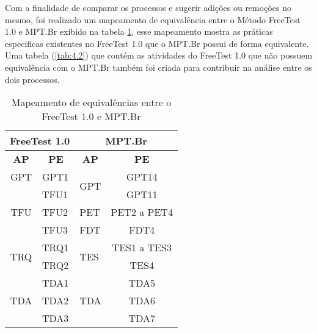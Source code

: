 Com a finalidade de comparar os processos e sugerir adições ou remoções no mesmo, foi realizado um mapeamento de equivalência entre o Método FreeTest 1.0 e MPT.Br exibido na tabela \ref{tab:4.1}, esse mapeamento mostra as práticas especificas existentes no FreeTest 1.0 que o MPT.Br possui de forma equivalente. Uma tabela (\ref{tab:4.2}) que contém as atividades do FreeTest 1.0 que não possuem equivalência com o MPT.Br também foi criada para contribuir na análise entre os dois processos.

\begin{table}[!ht]
\centering
\caption{Mapeamento de equivalências entre o FreeTest 1.0 e MPT.Br}
\label{tab:4.1}
\begin{tabular}{|c|l|l|c|}
\hline
\multicolumn{2}{|c|}{\textbf{FreeTest 1.0}}             & \multicolumn{2}{c|}{\textbf{MPT.Br}}           \\ \hline
\textbf{AP}          & \multicolumn{1}{c|}{\textbf{PE}} & \multicolumn{1}{c|}{\textbf{AP}} & \textbf{PE} \\ \hline
GPT                  & GPT1                             & \multirow{2}{*}{GPT}             & GPT14       \\ \cline{1-2} \cline{4-4} 
\multirow{3}{*}{TFU} & TFU1                             &                                  & GPT11       \\ \cline{2-4} 
                     & TFU2                             & PET                              & PET2 a PET4 \\ \cline{2-4} 
                     & TFU3                             & FDT                              & FDT4        \\ \hline
\multirow{2}{*}{TRQ} & TRQ1                             & \multirow{2}{*}{TES}             & TES1 a TES3 \\ \cline{2-2} \cline{4-4} 
                     & TRQ2                             &                                  & TES4        \\ \hline
\multirow{3}{*}{TDA} & TDA1                             & \multirow{3}{*}{TDA}             & TDA5        \\ \cline{2-2} \cline{4-4} 
                     & TDA2                             &                                  & TDA6        \\ \cline{2-2} \cline{4-4} 
                     & TDA3                             &                                  & TDA7        \\ \hline
\end{tabular}
\end{table}


